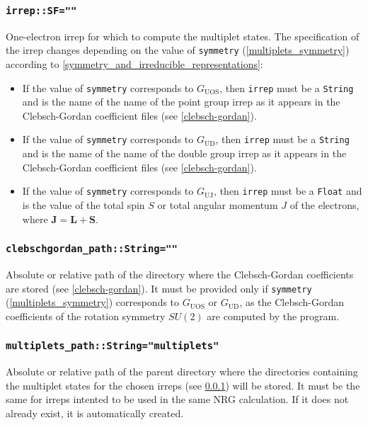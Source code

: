 \documentclass[notitlepage]{article}
\begin{document}
\subsubsection{\texttt{irrep::SF=""}}
\label{multiplets_irrep}
One-electron irrep for which to compute the multiplet
states. The specification of the irrep changes depending on
the value of \texttt{symmetry} (\ref{multiplets_symmetry})
according to \ref{symmetry_and_irreducible_representations}:
\begin{itemize}
    \item If the value of \texttt{symmetry} corresponds to
        $G_\text{UOS}$, then \texttt{irrep} must be a
        \texttt{String} and is the name of the name of the
        point group irrep as it appears in the
        Clebsch-Gordan coefficient files (see
        \ref{clebsch-gordan}).
    \item If the value of \texttt{symmetry} corresponds to
        $G_\text{UD}$, then \texttt{irrep} must be a
        \texttt{String} and is the name of the name of the
        double group irrep as it appears in the
        Clebsch-Gordan coefficient files (see
        \ref{clebsch-gordan}).
    \item If the value of \texttt{symmetry} corresponds to
        $G_\text{UJ}$, then \texttt{irrep} must be a
        \texttt{Float} and is the value of the total spin
        $S$ or total angular momentum $J$ of the electrons,
        where $\mathbf J=\mathbf L + \mathbf S$.
\end{itemize}

\subsubsection{\texttt{clebschgordan\_path::String=""}}
\label{multiplets_clebschgordan}
Absolute or relative path of the directory where the
Clebsch-Gordan coefficients are stored (see
\ref{clebsch-gordan}). It must be provided only if
\texttt{symmetry} (\ref{multiplets_symmetry}) corresponds to
$G_\text{UOS}$ or $G_\text{UD}$, as the Clebsch-Gordan
coefficients of the rotation symmetry $SU(2)$ are computed
by the program.

\subsubsection{\texttt{multiplets\_path::String="multiplets"}}
\label{multiplets_multipletspath}
Absolute or relative path of the parent directory where the
directories containing the multiplet states for the chosen
irreps (see \ref{multiplets_irrep}) will be stored. It must
be the same for irreps intented to be used in the same NRG
calculation. If it does not already exist, it is
automatically created.
\end{document}
